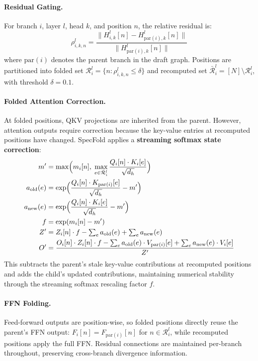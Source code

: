 \documentclass[11pt,a4paper]{article}
\begin{document}
\paragraph{Residual Gating.} For branch $i$, layer $l$, head $k$, and position $n$, the relative residual is:
\begin{equation}
\rho^l_{i,k,n} = \frac{\|H^l_{i,k}[n] - H^l_{\text{par}(i),k}[n]\|}{\|H^l_{\text{par}(i),k}[n]\|}
\end{equation}
where $\text{par}(i)$ denotes the parent branch in the draft graph. Positions are partitioned into folded set $\mathcal{R}^l_i = \{n : \rho^l_{i,k,n} \leq \delta\}$ and recomputed set $\bar{\mathcal{R}}^l_i = [N] \setminus \mathcal{R}^l_i$, with threshold $\delta{=}0.1$.

\paragraph{Folded Attention Correction.} At folded positions, QKV projections are inherited from the parent. However, attention outputs require correction because the key-value entries at recomputed positions have changed. SpecFold applies a \textbf{streaming softmax state correction}:
\begin{align}
m' &= \max\Bigl(m_i[n],\; \max_{e \in \bar{\mathcal{R}}^l_i} \frac{Q_i[n] \cdot K_i[e]}{\sqrt{d_h}}\Bigr) \\
a_{\text{old}}(e) &= \exp\Bigl(\frac{Q_i[n] \cdot K_{\text{par}(i)}[e]}{\sqrt{d_h}} - m'\Bigr) \\
a_{\text{new}}(e) &= \exp\Bigl(\frac{Q_i[n] \cdot K_i[e]}{\sqrt{d_h}} - m'\Bigr) \\
f &= \exp(m_i[n] - m') \\
Z' &= Z_i[n] \cdot f - \textstyle\sum_e a_{\text{old}}(e) + \sum_e a_{\text{new}}(e) \\
O' &= \frac{O_i[n] \cdot Z_i[n] \cdot f - \sum_e a_{\text{old}}(e) \cdot V_{\text{par}(i)}[e] + \sum_e a_{\text{new}}(e) \cdot V_i[e]}{Z'}
\end{align}
This subtracts the parent's stale key-value contributions at recomputed positions and adds the child's updated contributions, maintaining numerical stability through the streaming softmax rescaling factor $f$.

\paragraph{FFN Folding.} Feed-forward outputs are position-wise, so folded positions directly reuse the parent's FFN output: $F_i[n] = F_{\text{par}(i)}[n]$ for $n \in \mathcal{R}^l_i$, while recomputed positions apply the full FFN. Residual connections are maintained per-branch throughout, preserving cross-branch divergence information.
\end{document}
